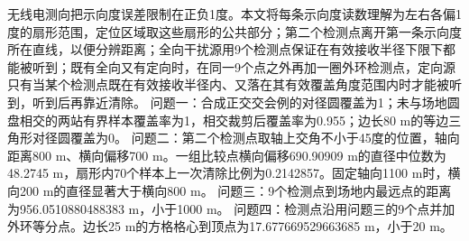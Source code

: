 无线电测向把示向度误差限制在正负1度。本文将每条示向度读数理解为左右各偏1度的扇形范围，定位区域取这些扇形的公共部分；第二个检测点离开第一条示向度所在直线，以便分辨距离；全向干扰源用9个检测点保证在有效接收半径下限下都能被听到；既有全向又有定向时，在同一9个点之外再加一圈外环检测点，定向源只有当某个检测点既在有效接收半径内、又落在其有效覆盖角度范围内时才能被听到，听到后再靠近清除。
问题一：合成正交交会例的对径圆覆盖为1；未与场地圆盘相交的两站有界样本覆盖率为1，相交裁剪后覆盖率为0.955；边长80 m的等边三角形对径圆覆盖为0。
问题二：第二个检测点取轴上交角不小于45度的位置，轴向距离800 m、横向偏移700 m。一组比较点横向偏移690.90909 m的直径中位数为48.2745 m，扇形内70个样本上一次清除比例为0.2142857。固定轴向1100 m时，横向200 m的直径显著大于横向800 m。
问题三：9个检测点到场地内最远点的距离为956.0510880488383 m，小于1000 m。
问题四：检测点沿用问题三的9个点并加外环等分点。边长25 m的方格格心到顶点为17.677669529663685 m，小于20 m。
